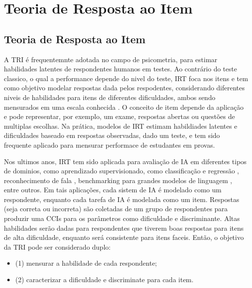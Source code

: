 \chapter{Teoria de Resposta ao Item}
\label{chap:n3_irt}

\section{Teoria de Resposta ao Item}
\label{sec:irt:classic}

 A \gls{TRI} é frequentemnte adotada no campo de psicometria, para estimar habilidades latentes de respondentes humanos em testes. Ao contrário do teste classico, o qual a performance depende do nivel do teste, \gls{IRT} foca nos itens e tem como objetivo modelar respostas dada pelos respodentes, considerando diferentes niveis de habilidades para itens de diferentes dificuldades, ambos sendo mensurados em uma escala conhecida \cite{embretson2013item}. O conceito de item depende da aplicação e pode representar, por exemplo, um exame, respostas abertas ou questões de multiplas escolhas. Na prática, modelos de \gls{IRT} estimam habildiades latentes e dificuldades baseado em respostas observadas, dado um teste, e tem sido frequente aplicado para mensurar performace de estudantes em provas.

 Nos ultimos anos, \gls{IRT} tem sido aplicada para avaliação de \gls{IA} em diferentes tipos de dominios, como aprendizado supervisionado, como classificação e regressão \cite{chen2019birt, martinez2016making, moraes2020item, moraes2022evaluating},  reconhecimento de fala \cite{oliveira2022two-level}, benchmarking para grandes modelos de linguagem \cite{castleman2025rethinking}, entre outros. Em tais aplicações, cada sistem de \gls{IA} é modelado como um respondente, enquanto cada tarefa de \gls{IA} é modelada como um item. Respostas (seja correta ou incorreta) são coletadas de um grupo de respondentes para produzir uma \gls{CCI}s para os parâmetros como dificuldade e discriminante. Altas habilidades serão dadas para respondentes que tiverem boas respostas para itens de alta dificuldade, enquanto será consistente para itens faceis. Então, o objetivo da \gls{TRI} pode ser considerado duplo:

 \begin{itemize}
     \item (1) mensurar a habilidade de cada respondente;
     \item (2) caracterizar a dificuldade e discriminate para cada item.
 \end{itemize}


